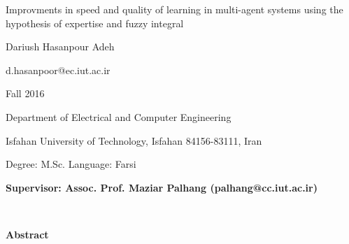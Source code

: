 \thispagestyle{empty}

\begin{latin}
\begin{center}

{\Huge Improvments in speed and quality of learning in multi-agent systems using the hypothesis of expertise and fuzzy integral}

\vspace{1cm}

{\LARGE{Dariush Hasanpour Adeh}}

\vspace{0.2cm}

{\small d.hasanpoor@ec.iut.ac.ir}

\vspace{0.5cm}

Fall 2016

\vspace{0.5cm}

Department of Electrical and Computer Engineering

\vspace{0.2cm}

Isfahan University of Technology, Isfahan 84156-83111, Iran

\vspace{0.2cm}

Degree: M.Sc. \hspace*{3cm} Language: Farsi

\vspace{1cm}

{\small\textbf{Supervisor: Assoc. Prof. Maziar Palhang (palhang@cc.iut.ac.ir)}}
\end{center}
~\vfill



\noindent\textbf{Abstract}


\end{latin}
